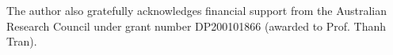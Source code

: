 \documentclass[11pt, reqno]{amsart}
\theoremstyle{definition}
\theoremstyle{remark}
\numberwithin{equation}{section}
\begin{document}
The author also gratefully acknowledges financial support from the Australian Research Council under grant number DP200101866 (awarded to Prof. Thanh Tran).

%

%
\end{document}
